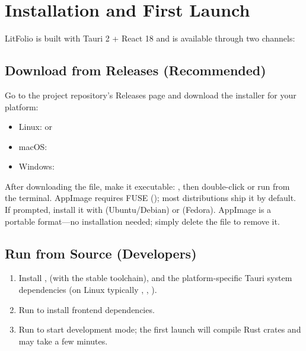 \section{Installation and First Launch}

LitFolio is built with Tauri 2 + React 18 and is available through two channels:

\subsection{Download from Releases (Recommended)}

Go to the project repository's Releases page and download the installer for your platform:

\begin{itemize}
  \item Linux:  or 
  \item macOS: 
  \item Windows: 
\end{itemize}

\begin{tipbox}
After downloading the  file, make it executable:
, then double-click or run from
the terminal. AppImage requires FUSE (); most distributions ship it
by default. If prompted, install it with 
(Ubuntu/Debian) or  (Fedora).
AppImage is a portable format---no installation needed; simply delete the file to
remove it.
\end{tipbox}

\subsection{Run from Source (Developers)}

\begin{enumerate}
  \item Install ,  (with the stable toolchain), and the
    platform-specific Tauri system dependencies
    (on Linux typically , , ).
  \item Run  to install frontend dependencies.
  \item Run  to start development mode; the first launch will
    compile Rust crates and may take a few minutes.
\end{enumerate}

